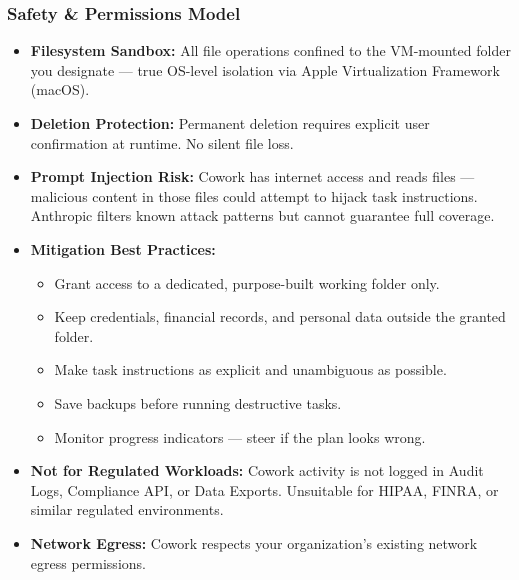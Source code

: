 \begin{frame}[fragile]\frametitle{Safety \& Permissions Model}
  \begin{itemize}
    \item \textbf{Filesystem Sandbox:} All file operations confined to the VM-mounted folder you designate — true OS-level isolation via Apple Virtualization Framework (macOS).
    \item \textbf{Deletion Protection:} Permanent deletion requires explicit user confirmation at runtime. No silent file loss.
    \item \textbf{Prompt Injection Risk:} Cowork has internet access and reads files — malicious content in those files could attempt to hijack task instructions. Anthropic filters known attack patterns but cannot guarantee full coverage.
    \item \textbf{Mitigation Best Practices:}
      \begin{itemize}
        \item Grant access to a dedicated, purpose-built working folder only.
        \item Keep credentials, financial records, and personal data outside the granted folder.
        \item Make task instructions as explicit and unambiguous as possible.
        \item Save backups before running destructive tasks.
        \item Monitor progress indicators — steer if the plan looks wrong.
      \end{itemize}
    \item \textbf{Not for Regulated Workloads:} Cowork activity is not logged in Audit Logs, Compliance API, or Data Exports. Unsuitable for HIPAA, FINRA, or similar regulated environments.
    \item \textbf{Network Egress:} Cowork respects your organization's existing network egress permissions.
  \end{itemize}
\end{frame}

